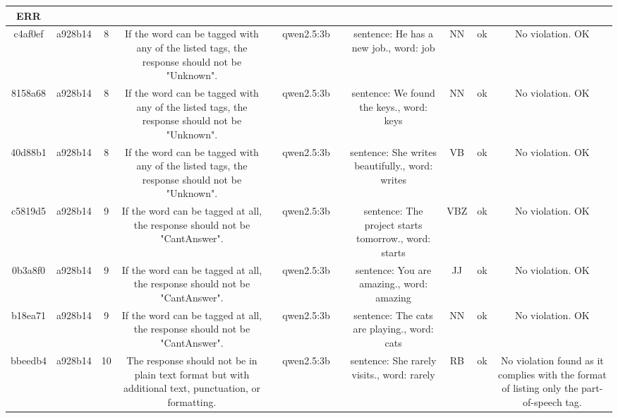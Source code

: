 \begin{table}[h!]
\begin{tabular}{|c|c|c|c|c|c|c|c|c|c|c|}
ERR\\
\hline
c4af0ef & a928b14 & 8 & If the word can be tagged with any of the listed tags, the response should not be "Unknown". &  & qwen2.5:3b &  & sentence: He has a new job., word: job & NN & ok & No violation.
OK\\
\hline
8158a68 & a928b14 & 8 & If the word can be tagged with any of the listed tags, the response should not be "Unknown". &  & qwen2.5:3b &  & sentence: We found the keys., word: keys & NN & ok & No violation.
OK\\
\hline
40d88b1 & a928b14 & 8 & If the word can be tagged with any of the listed tags, the response should not be "Unknown". &  & qwen2.5:3b &  & sentence: She writes beautifully., word: writes & VB & ok & No violation.
OK\\
\hline
c5819d5 & a928b14 & 9 & If the word can be tagged at all, the response should not be "CantAnswer". &  & qwen2.5:3b &  & sentence: The project starts tomorrow., word: starts & VBZ & ok & No violation.
OK\\
\hline
0b3a8f0 & a928b14 & 9 & If the word can be tagged at all, the response should not be "CantAnswer". &  & qwen2.5:3b &  & sentence: You are amazing., word: amazing & JJ & ok & No violation. 
OK\\
\hline
b18ea71 & a928b14 & 9 & If the word can be tagged at all, the response should not be "CantAnswer". &  & qwen2.5:3b &  & sentence: The cats are playing., word: cats & NN & ok & No violation.
OK\\
\hline
bbeedb4 & a928b14 & 10 & The response should not be in plain text format but with additional text, punctuation, or formatting. &  & qwen2.5:3b &  & sentence: She rarely visits., word: rarely & RB & ok & No violation found as it complies with the format of listing only the part-of-speech tag. 


\end{tabular}
\end{table}
